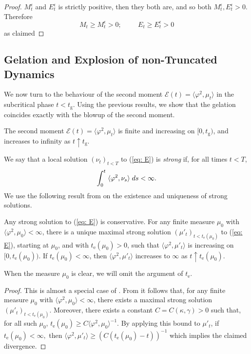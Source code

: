 \begin{proof}
$M^\epsilon_t$ and $E^\epsilon_t$ is strictly positive, then they both are, and so both $M^\epsilon_t, E^\epsilon_t>0$. Therefore \begin{equation} M_t\ge M^\epsilon_t >0;\hspace{1cm} E_t\ge E^\epsilon_t >0 \end{equation} as claimed \end{proof}
\subsection{Gelation and Explosion of non-Truncated Dynamics} We now turn to the behaviour of the second moment $\mathcal{E}(t)=\langle \varphi^2, \mu_t\rangle$ in the subcritical phase $t<t_\mathrm{g}$. Using the previous results, we show that the gelation coincides exactly with the blowup of the second moment. 
\begin{lemma}\label{lemma: second moment before tgel} The second moment $\mathcal{E}(t)=\langle \varphi^2, \mu_t\rangle$ is finite and increasing on $[0, t_\mathrm{g})$, and increases to infinity as $t\uparrow t_\mathrm{g}$. \end{lemma}  We say that a local solution $(\nu_t)_{t<T}$ to (\ref{eq: E}) is \emph{strong} if, for all times $t<T$, 
\begin{equation}
    \int_0^t  \hspace{0.1cm} \langle\varphi^2, \nu_s\rangle  \hspace{0.1cm} ds<\infty.
\end{equation} We use the following result from \cite{N00} on the existence and uniqueness of strong solutions. 
\begin{lemma}\label{lemma: strong solutions} Any strong solution to (\ref{eq: E}) is conservative. For any finite measure $\mu_0$ with $\langle \varphi^2, \mu_0\rangle <\infty$, there is a unique maximal strong solution $(\mu'_t)_{t<t_\mathrm{e}(\mu_0)}$ to (\ref{eq: E}), starting at $\mu_0$, and with $t_\mathrm{e}(\mu_0)>0$, such that $ \langle \varphi^2, \mu'_t\rangle$ is increasing on $[0,t_\mathrm{e}(\mu_0))$. If $t_\mathrm{e}(\mu_0)<\infty$, then $\langle \varphi^2, \mu'_t\rangle$ increases to $\infty$  as $t\uparrow t_\mathrm{e}(\mu_0)$.  \end{lemma} When the measure $\mu_0$ is clear, we will omit the argument of $t_\mathrm{e}.$ 
\begin{proof}
    This is almost a special case of \cite[Thrm. 2.1]{N00}. From \cite[Theorem 2.1]{N00} it follows that, for any finite measure $\mu_0$ with $\langle \varphi^2, \mu_0\rangle <\infty$, there exists a maximal strong solution $(\mu'_t)_{t<t_\mathrm{e}(\mu_0)}$. Moreover, there exists a constant $C=C(\kappa, \gamma)>0$ such that, for all such $\mu_0$,  $t_\mathrm{e}(\mu_0) \ge C \langle \varphi^2, \mu_0\rangle^{-1}$. By applying this bound to $\mu'_t$, if $t_\mathrm{e}(\mu_0)<\infty,$ then $\langle \varphi^2, \mu'_t\rangle \ge (C(t_\mathrm{e}(\mu_0)-t))^{-1}$  which implies the claimed divergence.
\end{proof}

